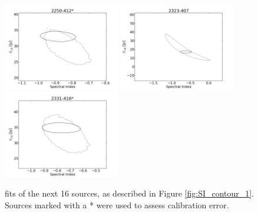 \documentclass[preprint]{aastex}
\begin{document}
\begin{figure}[htbp]
\begin{center}
\includegraphics[width=2in]{plots/2250-412_SI_MCMC.png} %
\includegraphics[width=2in]{plots/2323-407_SI_MCMC.png} %
\includegraphics[width=2in]{plots/2331-416_SI_MCMC.png} %
\end{center}
\caption{fits of the next 16 sources, as described in Figure \ref{fig:SI_contour_1}. Sources marked with a
* were used to assess calibration error.
}\label{fig:SI_contour_4}
\end{figure}
\end{document}
